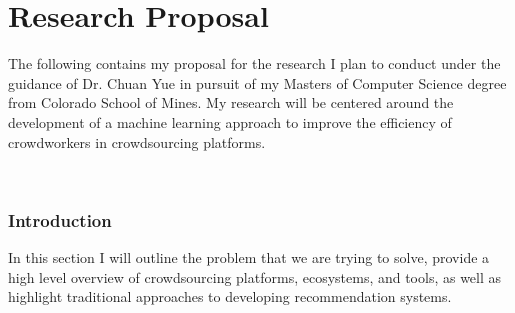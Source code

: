 \documentclass[letterpaper,12pt]{article}
\begin{document}





\bodymatter



\chapter{Research Proposal}

The following contains my proposal for the research I plan to conduct under the guidance of Dr. Chuan Yue in pursuit of my Masters of Computer Science degree from Colorado School of Mines. My research will be centered around the development of a machine learning approach to improve the efficiency of crowdworkers in crowdsourcing platforms.

~\cite{okura2017embedding}
\subsection{Introduction}%
In this section I will outline the problem that we are trying to solve, provide a high level overview of crowdsourcing platforms, ecosystems, and tools, as well as highlight traditional approaches to developing recommendation systems.
\end{document}
